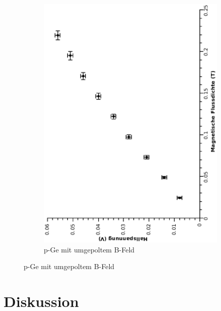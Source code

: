 \documentclass[12pt,a4paper,twopage]{article}
\begin{document}
\begin{figure}[H]
\begin{subfigure}{0.4\textwidth}
\includegraphics[width=0.9\linewidth, angle=-90]{ppeumpol.eps}
\caption{p-Ge mit umgepoltem B-Feld}
\end{subfigure}

\end{figure}


\section{Diskussion}		
																								
\end{document}
